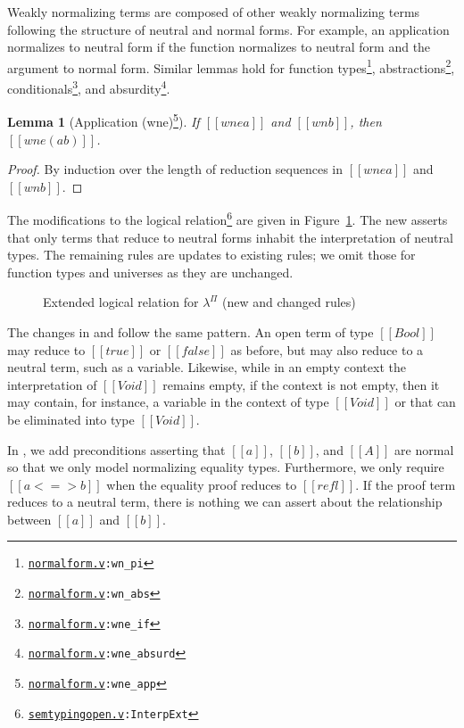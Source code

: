 \documentclass[\ifpublic nolinenum\else\fi,online,OA]{jfp}
\newcommand{\dotv}[2]{\href{#1}{\texttt{#1}}{\texttt{:#2}}}
\newcommand{\lang}{$\lambda^{\Pi}$\xspace}
\newtheorem{lemma}[theorem]{Lemma}
\theoremstyle{definition}
\begin{document}
Weakly normalizing terms are composed of other weakly normalizing terms
following the structure of neutral and normal forms. For example, an
application normalizes to neutral form if the function normalizes to neutral
form and the argument to normal form. Similar lemmas hold for
function types\footnote{\dotv{normalform.v}{wn\_pi}},
abstractions\footnote{\dotv{normalform.v}{wn\_abs}},
conditionals\footnote{\dotv{normalform.v}{wne\_if}},
and absurdity\footnote{\dotv{normalform.v}{wne\_absurd}}.

\begin{lemma}[Application (wne)\footnote{\dotv{normalform.v}{wne\_app}}]
  \label{lemma:wnewn}
  If $[[wne a]]$ and $[[wn b]]$, then $[[wne (a b)]]$.
\end{lemma}

\begin{proof}
  By induction over the length of reduction sequences in
  $[[wne a]]$ and $[[wn b]]$.
\end{proof}

The modifications to the logical relation\footnote{\dotv{semtypingopen.v}{InterpExt}}
are given in Figure~\ref{fig:logrelopen}. The new  asserts that
only terms that reduce to neutral forms inhabit the interpretation of neutral
types. The remaining rules are updates to existing rules; we omit those for
function types and universes as they are unchanged.

\begin{figure}
  \caption{Extended logical relation for \lang{} (new and changed rules)}
  \label{fig:logrelopen}
\end{figure}

The changes in  and  follow the same pattern. An open
term of type $[[Bool]]$ may reduce to $[[true]]$ or $[[false]]$ as before, but
may also reduce to a neutral term, such as a variable. Likewise, while in an
empty context the interpretation of $[[Void]]$ remains empty, if the context
is not empty, then it may contain, for instance, a variable in the context of
type $[[Void]]$ or that can be eliminated into type $[[Void]]$.

In , we add preconditions asserting that $[[a]]$, $[[b]]$, and
$[[A]]$ are normal so that we only model normalizing equality types.
Furthermore, we only require $[[a <=> b]]$ when the equality proof reduces to
$[[refl]]$. If the proof term reduces to a neutral term, there is nothing we
can assert about the relationship between $[[a]]$ and $[[b]]$.
\end{document}
